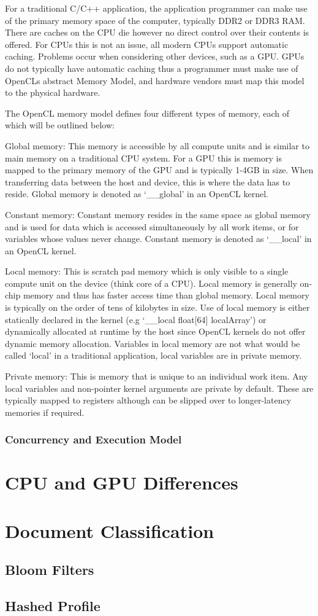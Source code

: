 For a traditional C/C++ application, the application programmer can make use of
the primary memory space of the computer, typically DDR2 or DDR3 RAM. There are
caches on the CPU die however no direct control over their contents is offered.
For CPUs this is not an issue, all modern CPUs support automatic caching.
Problems occur when considering other devices, such as a GPU. GPUs do not
typically have automatic caching thus a programmer must make use of OpenCLs
abstract Memory Model, and hardware vendors must map this model to the physical
hardware.

The OpenCL memory model defines four different types of memory, each of which
will be outlined below:

Global memory: This memory is accessible by all compute units and is similar to
main memory on a traditional CPU system. For a GPU this is memory is mapped to
the primary memory of the GPU and is typically 1-4GB in size. When transferring
data between the host and device, this is where the data has to reside. Global
memory is denoted as `\_\_global' in an OpenCL kernel.

Constant memory: Constant memory resides in the same space as global memory and
is used for data which is accessed simultaneously by all work items, or for
variables whose values never change. Constant memory is denoted as `\_\_local'
in an OpenCL kernel.

Local memory: This is scratch pad memory which is only visible to a single
compute unit on the device (think core of a CPU). Local memory is generally on-
chip memory and thus has faster access time than global memory. Local memory is
typically on the order of tens of kilobytes in size. Use of local memory is
either statically declared in the kernel (e.g `\_\_local float[64] localArray')
or dynamically allocated at runtime by the host since OpenCL kernels do not
offer dynamic memory allocation. Variables in local memory are not what would be
called `local' in a traditional application, local variables are in private
memory.

Private memory: This is memory that is unique to an individual work item. Any
local variables and non-pointer kernel arguments are private by default. These
are typically mapped to registers although can be slipped over to longer-latency
memories if required.

\subsubsection{Concurrency and Execution Model}

\section{CPU and GPU Differences}

\section{Document Classification}

\subsection{Bloom Filters}

\subsection{Hashed Profile}

